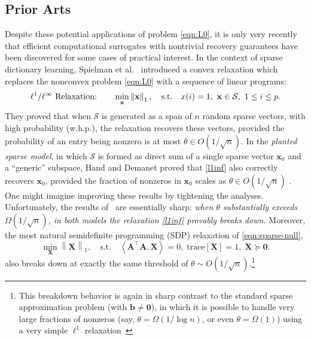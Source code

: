 \documentclass[11pt, journal, final]{IEEEtran}
\numberwithin{equation}{section}
\newcommand{\mb}{\mathbf}
\newcommand{\mc}{\mathcal}
\newcommand{\norm}[1]{\left\lVert#1\right\rVert}
\newcommand{ \paren }[1]{ \left( #1 \right) }
\begin{document}
{\subsection{Prior Arts}
Despite these potential applications of problem \eqref{eqn:L0}, it is only very recently that efficient computational surrogates with nontrivial recovery guarantees have been discovered for some cases of practical interest. In the context of sparse dictionary learning, Spielman et al.\ \cite{spielman2013exact} introduced a convex relaxation which replaces the nonconvex problem \eqref{eqn:L0} with a sequence of linear programs:
\begin{equation}
\ell^1/\ell^\infty \text{ Relaxation:}\qquad  \min_{\bf x} \norm{\bf x}_1,\quad \text{s.t.} \quad x(i)=1,~{\bf x}\in \mathcal{S},~1\le i \le p. \label{l1inf}
\end{equation}
They proved that when $\mc S$ is generated as a span of $n$ random sparse vectors, with high probability (w.h.p.), the relaxation recovers these vectors, provided the probability of an entry being nonzero is at most $\theta \in O\paren{ 1/\sqrt{n}}$. In the {\em planted sparse model}, in which $\mathcal{S}$ is formed as direct sum of a single sparse vector $\mb x_0$ and a ``generic'' subspace, Hand and Demanet proved that \eqref{l1inf} also correctly recovers $\mb x_0$, provided the fraction of nonzeros in $\mb x_0$ scales as $\theta \in O\paren{1/ \sqrt{n}}$ \cite{hand2013recovering}. One might imagine improving these results by tightening the analyses. Unfortunately, the results of~\cite{spielman2013exact,hand2013recovering} are essentially sharp: {\em when $\theta$ substantially exceeds $\Omega(1/\sqrt{n})$, in both models the relaxation \eqref{l1inf} provably breaks down.} Moreover, the most natural semidefinite programming (SDP) relaxation of \eqref{eqn:sparse-null},
\begin{equation} \label{eqn:SDP-relax}
\min_{\mb X} \norm{\mb X}_1, \quad \text{s.t.} \quad \left\langle \mb A^\top \mb A, \mb X \right\rangle = 0, \; \mathrm{trace}[\mb X] = 1, \; \mb X \succeq \mb 0.
\end{equation}
also breaks down at exactly the same threshold of $\theta \sim O(1/\sqrt{n})$.\footnote{This breakdown behavior is again in sharp contrast to the standard sparse approximation problem (with $\mb b \ne \mb 0$), in which it is possible to handle very large fractions of nonzeros (say, $\theta = \Omega(1/\log n)$, or even $\theta = \Omega(1)$) using a very simple $\ell^1$ relaxation~\cite{candes2005decoding, donoho2006most}}

}
\end{document}
